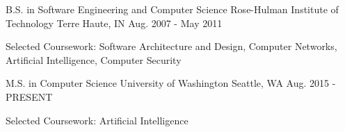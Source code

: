 

\begin{cventries}

  \cventry
    {B.S. in Software Engineering and Computer Science} %
    {Rose-Hulman Institute of Technology} %
    {Terre Haute, IN} %
    {Aug. 2007 - May 2011} %
    {
      \begin{cvitems} %
        \item {Selected Coursework: Software Architecture and Design, Computer Networks, Artificial Intelligence, Computer Security}
      \end{cvitems}
    }

  \cventry
    {M.S. in Computer Science} %
    {University of Washington} %
    {Seattle, WA} %
    {Aug. 2015 - PRESENT} %
    {
      \begin{cvitems} %
        \item {Selected Coursework: Artificial Intelligence}
      \end{cvitems}
    }
\end{cventries}
